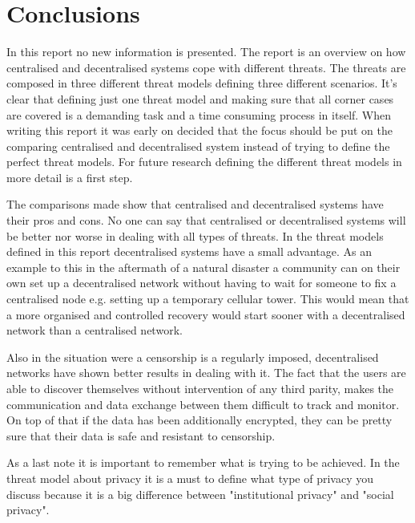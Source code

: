 \section{Conclusions}
In this report no new information is presented.
The report is an overview on how centralised and decentralised systems cope with different threats.
The threats are composed in three different threat models defining three different scenarios.
It's clear that defining just one threat model and making sure that all corner cases are covered is a demanding task and a time consuming process in itself.
When writing this report it was early on decided that the focus should be put on the comparing centralised and decentralised system instead of trying to define the perfect threat models.
For future research defining the different threat models in more detail is a first step.

The comparisons made show that centralised and decentralised systems have their pros and cons.
No one can say that centralised or decentralised systems will be better nor worse in dealing with all types of threats.
In the threat models defined in this report decentralised systems have a small advantage.
As an example to this in the aftermath of a natural disaster a community can on their own set up a decentralised network without having to wait for someone to fix a centralised node e.g. setting up a temporary cellular tower.
This would mean that a more organised and controlled recovery would start sooner with a decentralised network than a centralised network.

Also in the situation were a censorship is a regularly imposed, decentralised networks have shown better results in dealing with it. The fact that the users are able to discover themselves without intervention of any third parity, makes the communication and data exchange between them difficult to track and monitor. On top of that if the data has been additionally encrypted, they can be pretty sure that their data is safe and resistant to censorship.

As a last note it is important to remember what is trying to be achieved.
In the threat model about privacy it is a must to define what type of privacy you discuss because it is a big difference between "institutional privacy" and "social privacy".
